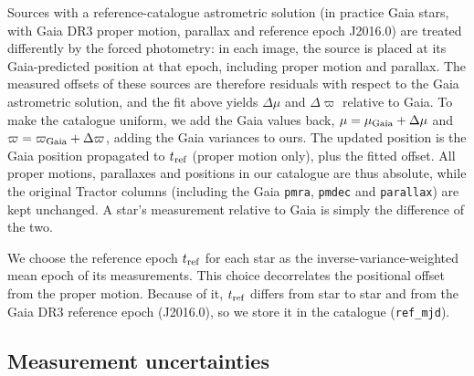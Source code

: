 \documentclass[usenatbib]{mnras}   %
\begin{document}
Sources with a reference-catalogue astrometric solution (in practice Gaia stars, with Gaia DR3 proper motion, parallax and reference epoch J2016.0) are treated differently by the forced photometry: in each image, the source is placed at its Gaia-predicted position at that epoch, including proper motion and parallax. The measured offsets of these sources are therefore residuals with respect to the Gaia astrometric solution, and the fit above yields $\Delta\mu$ and $\Delta\varpi$ relative to Gaia. To make the catalogue uniform, we add the Gaia values back, $\mu = \mu_{\rm Gaia} + \Delta\mu$ and $\varpi = \varpi_{\rm Gaia} + \Delta\varpi$, adding the Gaia variances to ours. The updated position is the Gaia position propagated to $t_{\rm ref}$ (proper motion only), plus the fitted offset. All proper motions, parallaxes and positions in our catalogue are thus absolute, while the original Tractor columns (including the Gaia \texttt{pmra}, \texttt{pmdec} and \texttt{parallax}) are kept unchanged. A star's measurement relative to Gaia is simply the difference of the two.

We choose the reference epoch $t_{\rm ref}$ for each star as the inverse-variance-weighted mean epoch of its measurements. This choice decorrelates the positional offset from the proper motion. Because of it, $t_{\rm ref}$ differs from star to star and from the Gaia DR3 reference epoch (J2016.0), so we store it in the catalogue (\texttt{ref\_mjd}).

\subsection{Measurement uncertainties}
\end{document}
